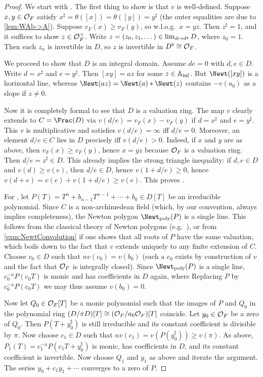 \begin{proof}
	We start with . The first thing to show is that $v$ is well-defined. Suppose $x,y\in \mathcal{O}_F$ satisfy $x^\sharp=\theta([x])=\theta([y])=y^\sharp$ (the outer equalities are due to \cref{lem:WAb->A}). Suppose $v_F(x)\geq v_F(y)$, so w.l.o.g.\ $x=yz$. Then $z^\sharp=1$, and it suffices to show $z\in\mathcal{O}_F^\times$. Write $z=(z_0,z_1,\dotsc)\in\operatorname*{lim}_{d\mapsto d^q}D$, where $z_0=1$. Then each $z_n$ is invertible in $D$, so $z$ is invertible in $D^\flat\cong \mathcal{O}_F$.
	
	We proceed to show that $D$ is an integral domain. Assume $de=0$ with $d,e\in D$. Write $d=x^\sharp$ and $e=y^\sharp$. Then $[xy]=az$ for some $z\in \mathbb{A}_{\mathrm{inf}}$. But $\Newt([xy])$ is a horizontal line, whereas $\Newt(az)=\Newt(a)*\Newt(z)$ contains $-v(a_0)$ as a slope if $z\neq 0$.
	
	Now it is completely formal to see that $D$ is a valuation ring. The map $v$ clearly extends to $C=\Frac(D)$ via $v(d/e)=v_F(x)-v_F(y)$ if $d=x^\sharp$ and $e=y^\sharp$. This $v$ is multiplicative and satisfies $v(d/e)=\infty$ iff $d/e=0$. Moreover, an element $d/e\in C$ lies in $D$ precisely iff $v(d/e)>0$. Indeed, if $x$ and $y$ are as above, then $v_F(x)\geq v_F(y)$, hence $x=yz$ because $\mathcal{O}_F$ is a valuation ring. Then $d/e=z^\sharp\in D$. This already implies the strong triangle inequality: if $d,e\in D$ and $v(d)\geq v(e)$, then $d/e\in D$, hence $v(1+d/e)\geq 0$, hence $v(d+e)=v(e)+v(1+d/e)\geq v(e)$. This proves .
	
	For , let $P(T)=T^n+b_{n-1}T^{n-1}+\dotsb+b_0\in D[T]$ be an irreducible polynomial. Since $C$ is a non-archimedean field (which, by our convention, always implies completeness), the Newton polygon $\Newt_\poly(P)$ is a single line. This follows from the classical theory of Newton polygons (e.g.\ \cite[Ch.\:II\:(6.4)]{NEUKIRCH}), or from \cref{exm:NewtConvolution} if one shows that all roots of $P$ have the same valuation, which boils down to the fact that $v$ extends uniquely to any finite extension of $C$. Choose $c_0\in D$ such that $nv(c_0)=v(b_0)$ (such a $c_0$ exists by construction of $v$ and the fact that $\mathcal{O}_F$ is integrally closed). Since $\Newt_\poly(P)$ is a single line, $c_0^{-n}P(c_0T)$ is monic and has coefficients in $D$ again, where  Replacing $P$ by $c_0^{-n}P(c_0T)$ we may thus assume $v(b_0)=0$.
	
	Now let $Q_0\in\mathcal{O}_F[T]$ be a monic polynomial such that the images of $P$ and $Q_0$ in the polynomial ring $(D/\pi D)[T]\cong (\mathcal{O}_F/a_0\mathcal{O}_F)[T]$ coincide. Let $y_0\in \mathcal{O}_F$ be a zero of $Q_0$. Then $P(T+y_0^\sharp)$ is still irreducible and its constant coefficient is divisible by $\pi$. Now choose $c_1\in D$ such that $nv(c_1)=v(P(y_0^\sharp))\geq v(\pi)$. As above, $P_1(T)=c_1^{-n}P(c_1T+y_0^\sharp)$ is monic, has coefficients in $D$, and its constant coefficient is invertible. Now choose $Q_1$ and $y_1$ as above and iterate the argument. The series $y_0+c_1y_1+\dotsb$ converges to a zero of $P$.
\end{proof}
